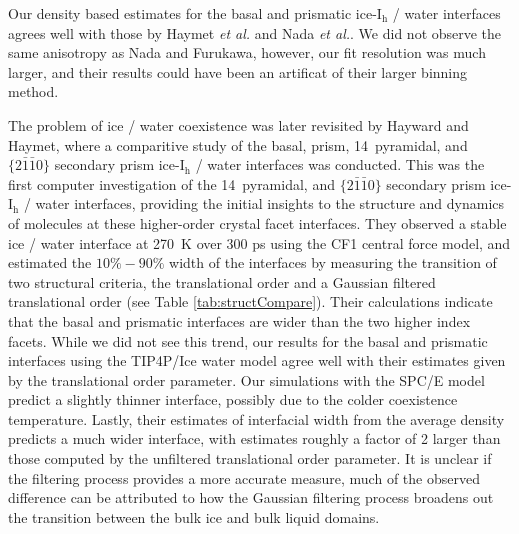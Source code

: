 Our density based estimates for the basal and prismatic
ice-I$_\mathrm{h}$ / water interfaces agrees well with those by Haymet
\textit{et al.} and Nada \textit{et al.}. We did not observe the same
anisotropy as Nada and Furukawa, however, our fit resolution was much
larger, and their results could have been an artificat of their larger
binning method. 

The problem of ice / water coexistence was later revisited by Hayward
and Haymet, where a comparitive study of the basal, prism,
14\degree~pyramidal, and $\{2\bar{1}\bar{1}0\}$ secondary prism
ice-I$_\mathrm{h}$ / water interfaces was conducted.\cite{Hayward2001}
This was the first computer investigation of the 14\degree~pyramidal,
and $\{2\bar{1}\bar{1}0\}$ secondary prism ice-I$_\mathrm{h}$ / water
interfaces, providing the initial insights to the structure and
dynamics of molecules at these higher-order crystal facet
interfaces. %
They observed a stable ice / water interface at 270~K over 300 ps
using the CF1 central force model, and estimated the $10\%-90\%$ width
of the interfaces by measuring the transition of two structural
criteria, the translational order and a Gaussian filtered
translational order (see Table \ref{tab:structCompare}). Their
calculations indicate that the basal and prismatic interfaces are
wider than the two higher index facets. While we did not see this
trend, our results for the basal and prismatic interfaces using the
TIP4P/Ice water model agree well with their estimates given by the
translational order parameter. Our simulations with the SPC/E model
predict a slightly thinner interface, possibly due to the colder
coexistence temperature. Lastly, their estimates of interfacial width
from the average density predicts a much wider interface, with
estimates roughly a factor of 2 larger than those computed by the
unfiltered translational order parameter. It is unclear if the
filtering process provides a more accurate measure, much of the
observed difference can be attributed to how the Gaussian filtering
process broadens out the transition between the bulk ice and bulk
liquid domains.
 

